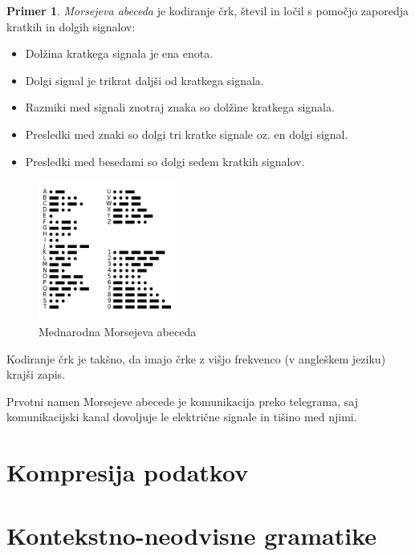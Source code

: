 \documentclass{amsart}
\theoremstyle{definition} %
\newtheorem{primer}[definicija]{Primer}
\theoremstyle{plain} %
\begin{document}
\begin{primer}
    \textit{Morsejeva abeceda} je kodiranje črk, števil in ločil s pomočjo zaporedja kratkih
    in dolgih signalov:

    \begin{itemize}
        \item Dolžina kratkega signala je ena enota.
        \item Dolgi signal je trikrat daljši od kratkega signala.
        \item Razmiki med signali znotraj znaka so dolžine kratkega signala.
        \item Presledki med znaki so dolgi tri kratke signale oz. en dolgi signal.
        \item Presledki med besedami so dolgi sedem kratkih signalov.
    \end{itemize}

    \begin{figure}[h]
        \centering
        \includegraphics[width=4.5cm]{International_Morse_Code.svg.png}
        \caption{Mednarodna Morsejeva abeceda}
    \end{figure}

    Kodiranje črk je takšno, da imajo črke z višjo frekvenco (v angleškem jeziku)
    krajši zapis. 
    
    Prvotni namen Morsejeve abecede je komunikacija preko telegrama, saj komunikacijski
    kanal dovoljuje le električne signale in tišino med njimi. 
 

\end{primer}

\section{Kompresija podatkov}

\section{Kontekstno-neodvisne gramatike}
\end{document}
